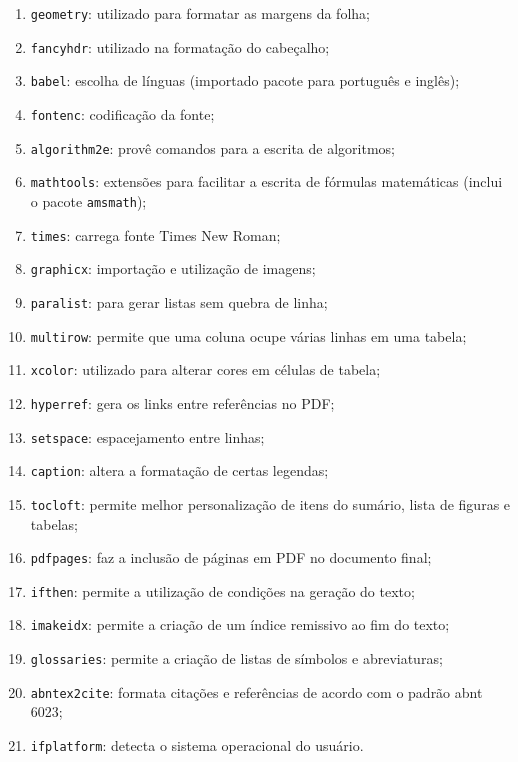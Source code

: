 \documentclass{fei}
\begin{document}
    \begin{enumerate}
        \item\texttt{geometry}: utilizado para formatar as margens da folha;
        \item\texttt{fancyhdr}: utilizado na formatação do cabeçalho;
        \item\texttt{babel}: escolha de línguas (importado pacote para português e inglês);
        \item\texttt{fontenc}: codificação da fonte;
        \item\texttt{algorithm2e}: provê comandos para a escrita de algoritmos;
        \item\texttt{mathtools}: extensões para facilitar a escrita de fórmulas matemáticas (inclui o pacote \texttt{amsmath});
        \item\texttt{times}: carrega fonte Times New Roman;
        \item\texttt{graphicx}: importação e utilização de imagens;
        \item\texttt{paralist}: para gerar listas sem quebra de linha;
        \item\texttt{multirow}: permite que uma coluna ocupe várias linhas em uma tabela;
        \item\texttt{xcolor}: utilizado para alterar cores em células de tabela;
        \item\texttt{hyperref}: gera os links entre referências no PDF;
        \item\texttt{setspace}: espacejamento entre linhas;
        \item\texttt{caption}: altera a formatação de certas legendas;
        \item\texttt{tocloft}: permite melhor personalização de itens do sumário, lista de figuras e tabelas;
        \item\texttt{pdfpages}: faz a inclusão de páginas em PDF no documento final;
        \item\texttt{ifthen}: permite a utilização de condições na geração do texto;
        \item\texttt{imakeidx}: permite a criação de um índice remissivo ao fim do texto;
        \item{}\texttt{glossaries}: permite a criação de listas de símbolos e abreviaturas;
        \item\texttt{abntex2cite}: formata citações e referências de acordo com o padrão \gls{abnt} 6023;
        \item\texttt{ifplatform}: detecta o sistema operacional do usuário.
    \end{enumerate}
\end{document}
